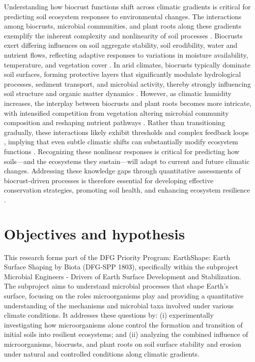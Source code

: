 Understanding how biocrust functions shift across climatic gradients is critical for predicting soil ecosystem responses to environmental changes. The interactions among biocrusts, microbial communities, and plant roots along these gradients exemplify the inherent complexity and nonlinearity of soil processes \citep{Wang2014}. Biocrusts exert differing influences on soil aggregate stability, soil erodibility, water and nutrient flows, reflecting adaptive responses to variations in moisture availability, temperature, and vegetation cover \citep{Belnap2003,Weber2022}. In arid climates, biocrusts typically dominate soil surfaces, forming protective layers that significantly modulate hydrological processes, sediment transport, and microbial activity, thereby strongly influencing soil structure and organic matter dynamics \citep{Kidron2021,RodriguezCaballero2018}. However, as climatic humidity increases, the interplay between biocrusts and plant roots becomes more intricate, with intensified competition from vegetation altering microbial community composition and reshaping nutrient pathways \citep{RiverasMunoz2022,Seitz2017}. Rather than transitioning gradually, these interactions likely exhibit thresholds and complex feedback loops \citep{Wang2014}, implying that even subtle climatic shifts can substantially modify ecosystem functions \citep{Bernhard2018}. Recognizing these nonlinear responses is critical for predicting how soils—and the ecosystems they sustain—will adapt to current and future climatic changes. Addressing these knowledge gaps through quantitative assessments of biocrust-driven processes is therefore essential for developing effective conservation strategies, promoting soil health, and enhancing ecosystem resilience \citep{BelnapBudel2016,Weber2022}.

\section{Objectives and hypothesis}
\label{sec:ObjectivesHypothesis}

This research forms part of the DFG Priority Program: EarthShape: Earth Surface Shaping by Biota (DFG-SPP 1803), specifically within the subproject Microbial Engineers - Drivers of Earth Surface Development and Stabilization. The subproject aims to understand microbial processes that shape Earth's surface, focusing on the roles microorganisms play and providing a quantitative understanding of the mechanisms and microbial taxa involved under various climate conditions. It addresses these questions by: (i) experimentally investigating how microorganisms alone control the formation and transition of initial soils into resilient ecosystems; and (ii) analyzing the combined influence of microorganisms, biocrusts, and plant roots on soil surface stability and erosion under natural and controlled conditions along climatic gradients.

